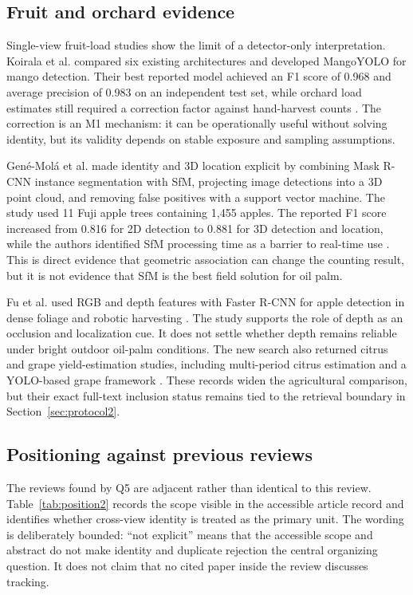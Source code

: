 \subsection{Fruit and orchard evidence}

Single-view fruit-load studies show the limit of a detector-only interpretation. Koirala et al. compared six existing architectures and developed MangoYOLO for mango detection. Their best reported model achieved an F1 score of 0.968 and average precision of 0.983 on an independent test set, while orchard load estimates still required a correction factor against hand-harvest counts \cite{koirala2019deepfruit}. The correction is an M1 mechanism: it can be operationally useful without solving identity, but its validity depends on stable exposure and sampling assumptions.

Gené-Molá et al. made identity and 3D location explicit by combining Mask R-CNN instance segmentation with SfM, projecting image detections into a 3D point cloud, and removing false positives with a support vector machine. The study used 11 Fuji apple trees containing 1,455 apples. The reported F1 score increased from 0.816 for 2D detection to 0.881 for 3D detection and location, while the authors identified SfM processing time as a barrier to real-time use \cite{genemola2020fruit3d}. This is direct evidence that geometric association can change the counting result, but it is not evidence that SfM is the best field solution for oil palm.

Fu et al. used RGB and depth features with Faster R-CNN for apple detection in dense foliage and robotic harvesting \cite{fu2020apple}. The study supports the role of depth as an occlusion and localization cue. It does not settle whether depth remains reliable under bright outdoor oil-palm conditions. The new search also returned citrus and grape yield-estimation studies, including multi-period citrus estimation and a YOLO-based grape framework \cite{zhai2025citrusyields,ma2026grapeyield}. These records widen the agricultural comparison, but their exact full-text inclusion status remains tied to the retrieval boundary in Section~\ref{sec:protocol2}.

\subsection{Positioning against previous reviews}

The reviews found by Q5 are adjacent rather than identical to this review. Table~\ref{tab:position2} records the scope visible in the accessible article record and identifies whether cross-view identity is treated as the primary unit. The wording is deliberately bounded: ``not explicit'' means that the accessible scope and abstract do not make identity and duplicate rejection the central organizing question. It does not claim that no cited paper inside the review discusses tracking.

